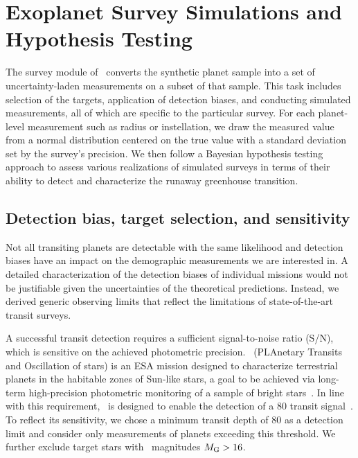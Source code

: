 \documentclass[twocolumn,twocolappendix]{aastex631}
\begin{document}
\section{Exoplanet Survey Simulations and Hypothesis Testing}\label{sec:met_surveys-hypotests}
The survey module of \bioverse\ converts the synthetic planet sample into a set of uncertainty-laden measurements on a subset of that sample.
This task includes selection of the targets, application of detection biases, and conducting simulated measurements, all of which are specific to the particular survey.
For each planet-level measurement such as radius or instellation, we draw the measured value from a normal distribution centered on the true value with a standard deviation set by the survey's precision.
We then follow a Bayesian hypothesis testing approach to assess various realizations of simulated surveys in terms of their ability to detect and characterize the runaway greenhouse transition.

\subsection{Detection bias, target selection, and sensitivity}\label{sec:sensitivity} %
Not all transiting planets are detectable with the same likelihood and detection biases have an impact on the demographic measurements we are interested in.
A detailed characterization of the detection biases of individual missions would not be justifiable given the uncertainties of the theoretical predictions.
Instead, we derived generic observing limits that reflect the limitations of state-of-the-art transit surveys.

A successful transit detection requires a sufficient signal-to-noise ratio (S/N), which is sensitive on the achieved photometric precision. %
\plato\ (PLAnetary Transits and Oscillation of stars) is an ESA mission designed to characterize terrestrial planets in the habitable zones of Sun-like stars, a goal to be achieved via long-term high-precision photometric monitoring of a sample of bright stars~\citep{Rauer2016}.
In line with this requirement, \plato\ is designed to enable the detection of a \SI{80}{\ppm} transit signal~\citep[][Matuszewski et al., in prep.]{plato2017}.
To reflect its sensitivity, we chose a minimum transit depth of \SI{80}{\ppm} as a detection limit and consider only measurements of planets exceeding this threshold.
We further exclude target stars with \gaia\ magnitudes $M_\mathrm{G} > 16$.
\end{document}
